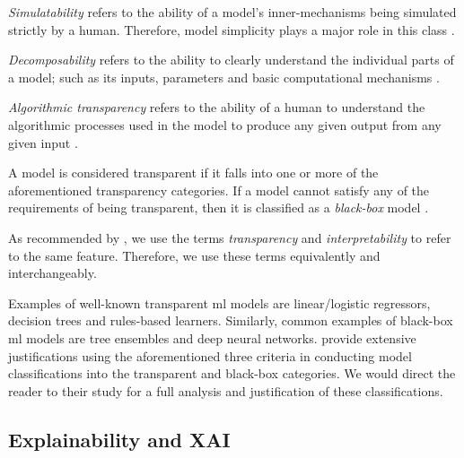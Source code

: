 \begin{remark}
  \textit{Simulatability} refers to the ability of a model's inner-mechanisms
  being simulated strictly by a human. Therefore, model simplicity plays a major
  role in this class \citep[Page 6, Section 2.5.1]{arrieta2020explainable}.
\end{remark}

\begin{remark}
  \textit{Decomposability} refers to the ability to clearly understand the
  individual parts of a model; such as its inputs, parameters and basic
  computational mechanisms \citep[Page 7, Section 2.5.1]{arrieta2020explainable}.
\end{remark}

\begin{remark}
  \textit{Algorithmic transparency} refers to the ability of a human to
  understand the algorithmic processes used in the model to produce any given
  output from any given input \citep[Page 7, Section 2.5.1]{arrieta2020explainable}.
\end{remark}

\begin{remark}
  A model is considered transparent if it falls into one or more of the
  aforementioned transparency categories. If a model cannot satisfy any of the
  requirements of being transparent, then it is classified as a
  \textit{black-box} model \citep[Page 7, Section 3]{arrieta2020explainable}.
\end{remark}

\begin{remark}
  \label{rmk:equivalence}
  As recommended by \citet[Page 3, Section 2.1]{arrieta2020explainable}, we use
  the terms \textit{transparency} and \textit{interpretability} to refer to the same feature.
  Therefore, we use these terms equivalently and interchangeably.
\end{remark}

Examples of well-known transparent \ac{ml} models are linear/logistic
regressors, decision trees and rules-based learners. Similarly, common examples
of black-box \ac{ml} models are tree ensembles and deep neural networks.
\citet[Page 7, Section 3]{arrieta2020explainable} provide extensive
justifications using the aforementioned three criteria in conducting model
classifications into the transparent and black-box categories. We would direct
the reader to their study for a full analysis and justification of these
classifications.

\subsection{Explainability and XAI}


